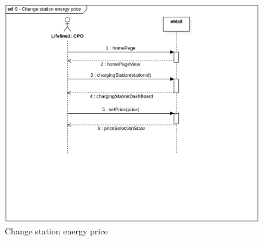 \begin{figure}[H]
    \begin{center}
        \includegraphics[width=\textwidth]{img/sequence/energy-price.png}
        \caption{Change station energy price}
    \end{center}
\end{figure}
